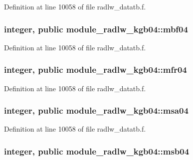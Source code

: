 Definition at line 10058 of file radlw\+\_\+datatb.\+f.

\subsubsection[{\texorpdfstring{mbf04}{mbf04}}]{\setlength{\rightskip}{0pt plus 5cm}integer, public module\+\_\+radlw\+\_\+kgb04\+::mbf04}\hypertarget{namespacemodule__radlw__kgb04_a768f4447809fb11206dce383a121d595}{}\label{namespacemodule__radlw__kgb04_a768f4447809fb11206dce383a121d595}


Definition at line 10058 of file radlw\+\_\+datatb.\+f.

\subsubsection[{\texorpdfstring{mfr04}{mfr04}}]{\setlength{\rightskip}{0pt plus 5cm}integer, public module\+\_\+radlw\+\_\+kgb04\+::mfr04}\hypertarget{namespacemodule__radlw__kgb04_ab6ae25b4a793bf78ccd504685d639039}{}\label{namespacemodule__radlw__kgb04_ab6ae25b4a793bf78ccd504685d639039}


Definition at line 10058 of file radlw\+\_\+datatb.\+f.

\subsubsection[{\texorpdfstring{msa04}{msa04}}]{\setlength{\rightskip}{0pt plus 5cm}integer, public module\+\_\+radlw\+\_\+kgb04\+::msa04}\hypertarget{namespacemodule__radlw__kgb04_ac8c5caff005fd04d01009dd9e977d570}{}\label{namespacemodule__radlw__kgb04_ac8c5caff005fd04d01009dd9e977d570}


Definition at line 10058 of file radlw\+\_\+datatb.\+f.

\subsubsection[{\texorpdfstring{msb04}{msb04}}]{\setlength{\rightskip}{0pt plus 5cm}integer, public module\+\_\+radlw\+\_\+kgb04\+::msb04}\hypertarget{namespacemodule__radlw__kgb04_ab9ce0111a156f7b80f2adaa9f3e84a32}{}\label{namespacemodule__radlw__kgb04_ab9ce0111a156f7b80f2adaa9f3e84a32}


